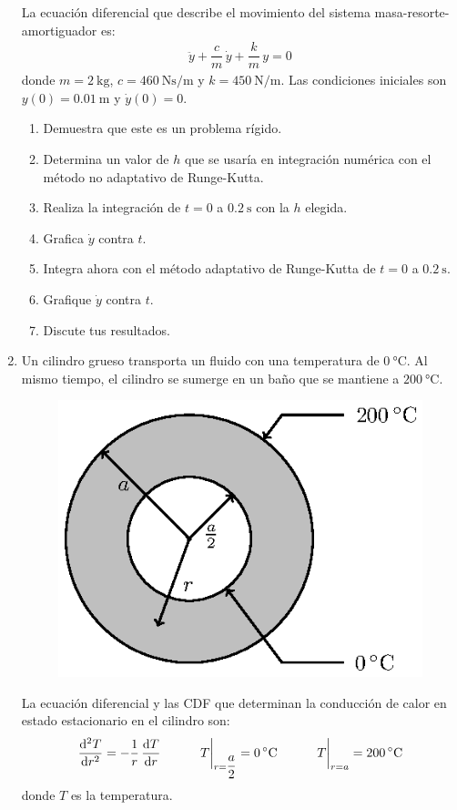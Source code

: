 \begin{enumerate}
La ecuación diferencial que describe el movimiento del sistema masa-resorte-amortiguador es:
\begin{align*}
\ddot{y} + \dfrac{c}{m} \, \dot{y} + \dfrac{k}{m} \, y = 0
\end{align*}
donde $m = \SI{2}{\kilo\gram}$, $c = \SI{460}{\newton\second\per\metre}$ y $k = \SI{450}{\newton\per\metre}$. Las condiciones iniciales son $y (0) = \SI{0.01}{\metre}$ y $\dot{y} (0) = 0$.
\begin{enumerate}
\item Demuestra que este es un problema rígido.
\item Determina un valor de $h$ que se usaría en integración numérica con el método no adaptativo de Runge-Kutta.
\item Realiza la integración de $t = 0$ a $\SI{0.2}{\second}$ con la $h$ elegida.
\item Grafica $\dot{y}$ contra $t$.
\item Integra ahora con el método adaptativo de Runge-Kutta de $t = 0$ a $\SI{0.2}{\second}$.
\item Grafique $\dot{y}$ contra $t$.
\item Discute tus resultados.
\end{enumerate}
\item Un cilindro grueso transporta un fluido con una temperatura de $\SI{0}{\celsius}$. Al mismo tiempo, el cilindro se sumerge en un baño que se mantiene a $\SI{200}{\celsius}$.
\begin{figure}[H]
    \centering
    \includegraphics[scale=1]{fig_edo_cdf_cilindro_01.eps}
\end{figure}
La ecuación diferencial y las CDF que determinan la conducción de calor en estado estacionario en el cilindro son:
\begin{align*}
\dv[2]{T}{r} = -\dfrac{1}{r} \, \dv{T}{r} \hspace{1cm} \eval{T}_{r = \dfrac{a}{2}} = \SI{0}{\celsius} \hspace{1cm} \eval{T}_{r = a} = \SI{200}{\celsius}
\end{align*}
donde $T$ es la temperatura.


\end{enumerate}
